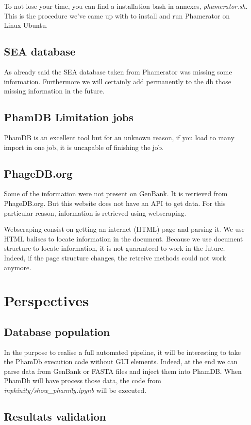 \documentclass[a4paper,11pt]{report}
\begin{document}
To not lose your time, you can find a installation bash in annexes, \textit{phamerator.sh}. This is the procedure we've came up with to install and run Phamerator on Linux Ubuntu.

\subsection{SEA database}
As already said the SEA database taken from Phamerator was missing some information. Furthermore we will certainly add permanently to the db those missing information in the future.

\subsection{PhamDB Limitation jobs}
PhamDB is an excellent tool but for an unknown reason, if you load to many import in one job, it is uncapable of finishing the job.

\subsection{PhageDB.org}
Some of the information were not present on GenBank. It is retrieved from PhageDB.org. But this website does not have an API to get data. For this particular reason, information is retrieved using webscraping.

Webscraping consist on getting an internet (HTML) page and parsing it. We use HTML balises to locate information in the document. Because we use document structure to locate information, it is not guaranteed to work in the future. Indeed, if the page structure changes, the retreive methods could not work anymore.

\section{Perspectives}
\subsection{Database population}

In the purpose to realise a full automated pipeline, it will be interesting to take the PhamDb execution code without GUI elements. Indeed, at the end we can parse data from GenBank or FASTA files and inject them into PhamDB. When PhamDb will have process those data, the code from \textit{inphinity/show\_phamily.ipynb} will be executed.

\subsection{Resultats validation}
\end{document}
